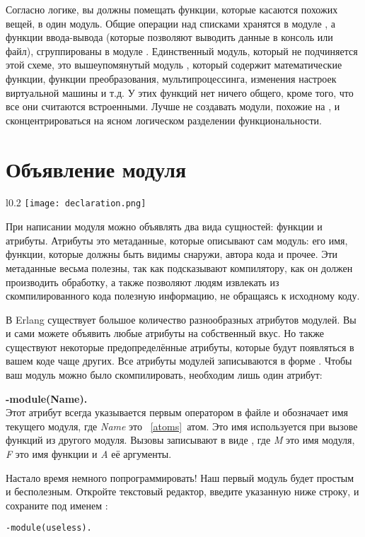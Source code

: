 Согласно логике, вы должны помещать функции, которые касаются похожих вещей, в один модуль.
Общие операции над списками хранятся в модуле , а функции ввода\--вывода (которые позволяют выводить данные в консоль или файл), сгруппированы в модуле .
Единственный модуль, который не подчиняется этой схеме, это вышеупомянутый модуль , который содержит математические функции, функции преобразования, мультипроцессинга, изменения настроек виртуальной машины и т.д.
У этих функций нет ничего общего, кроме того, что все они считаются встроенными.
Лучше не создавать модули, похожие на , и сконцентрироваться на ясном логическом разделении функциональности.
\section{Объявление модуля}
\label{module-declaration}
\begin{wrapfigure}{l}{0.2\linewidth}
    \texttt{[image: declaration.png]}
\end{wrapfigure}
При написании модуля можно объявлять два вида сущностей: функции и атрибуты.
Атрибуты это метаданные, которые описывают сам модуль: его имя, функции, которые должны быть видимы снаружи, автора кода и прочее.
Эти метаданные весьма полезны, так как подсказывают компилятору, как он должен производить обработку, а также позволяют людям извлекать из скомпилированного кода полезную информацию, не обращаясь к исходному коду.

В Erlang существует большое количество разнообразных атрибутов модулей.
Вы и сами можете объявить любые атрибуты на собственный вкус.
Но также существуют некоторые предопределённые атрибуты, которые будут появляться в вашем коде чаще других.
Все атрибуты модулей записываются в форме .
Чтобы ваш модуль можно было скомпилировать, необходим лишь один атрибут:

\begin{minipage}{1\linewidth}
    \textbf{-module(Name).}\\ 
    Этот атрибут всегда указывается первым оператором в файле и обозначает имя текущего модуля, где \emph{Name} это ~\ref{atoms}~атом.
    Это имя используется при вызове функций из другого модуля.
    Вызовы записывают в виде , где \emph{M} это имя модуля, \emph{F} это имя функции и \emph{A} её аргументы.
\end{minipage}

Настало время немного попрограммировать!
Наш первый модуль будет простым и бесполезным.
Откройте текстовый редактор, введите указанную ниже строку, и сохраните под именем :
\begin{lstlisting}[style=repl]
-module(useless).
\end{lstlisting}


